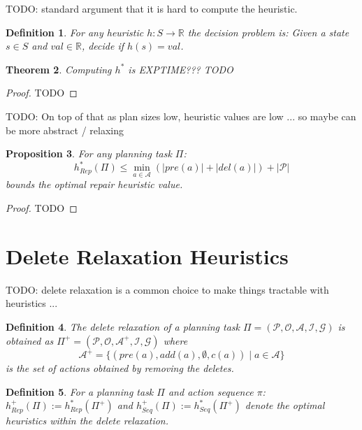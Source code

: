 \documentclass[twocolumn]{article}
\newcommand{\task}{\ensuremath{\Pi}\xspace}
\newcommand{\preds}{\ensuremath{\mathcal{P}}\xspace}
\newcommand{\acts}{\ensuremath{\mathcal{A}}\xspace}
\newcommand{\objects}{\ensuremath{\mathcal{O}}\xspace}
\newcommand{\init}{\ensuremath{\mathcal{I}}\xspace}
\newcommand{\goal}{\ensuremath{\mathcal{G}}\xspace}
\newcommand{\states}{\ensuremath{S}\xspace}
\newcommand{\someState}{\ensuremath{s}\xspace}
\newcommand{\prename}{\ensuremath{pre}\xspace}
\newcommand{\addname}{\ensuremath{add}\xspace}
\newcommand{\delname}{\ensuremath{del}\xspace}
\newcommand{\pre}[1]{\ensuremath{\prename(#1)}\xspace}
\newcommand{\add}[1]{\ensuremath{\addname(#1)}\xspace}
\newcommand{\del}[1]{\ensuremath{\delname(#1)}\xspace}
\newcommand{\arity}[1]{\ensuremath{|#1|}}
\newcommand{\cost}[1]{\ensuremath{c(#1)}\xspace}
\newcommand{\someAct}{\ensuremath{a}\xspace}
\newcommand{\someActSeq}{\ensuremath{\pi}\xspace}
\newcommand{\optimalHeuristic}{\ensuremath{h^{*}_{Rep}}\xspace}
\newcommand{\optimalHeuristicSeq}{\ensuremath{h^{*}_{Seq}}\xspace}
\newcommand{\optimalHeuristicRel}{\ensuremath{h^{+}_{Rep}}\xspace}
\newcommand{\optimalHeuristicSeqRel}{\ensuremath{h^{+}_{Seq}}\xspace}
\newcommand{\relaxedActs}{\ensuremath{\acts^{+}}\xspace}
\newcommand{\relaxedTask}{\ensuremath{\task^{+}}\xspace}
\newtheorem{theorem}{Theorem}
\newtheorem{proposition}[theorem]{Proposition}
\newtheorem{definition}[theorem]{Definition}
\begin{document}
	TODO: standard argument that it is hard to compute the heuristic.
	
	\begin{definition}
		For any heuristic $h: \states \rightarrow \mathbb{R}$ the decision problem is:
		Given a state $\someState \in \states$ and $\mathit{val} \in \mathbb{R}$, decide if $h(\someState) = \mathit{val}$.
	\end{definition}
	
	\begin{theorem}
		Computing $h^*$ is EXPTIME??? TODO
	\end{theorem}
	
	\begin{proof}
		TODO
	\end{proof}
	
	
	TODO:
	On top of that as plan sizes low, heuristic values are low ... so maybe can be more 
	abstract / relaxing
	
	\begin{proposition}
		For any planning task \task:
		$$\optimalHeuristic(\task) \leq \min_{\someAct \in \acts}(\arity{\pre{\someAct}} + \arity{\del{\someAct}}) + \arity{\preds}$$
		bounds the optimal repair heuristic value.
	\end{proposition}
	
	\begin{proof}
		TODO
	\end{proof}
	
	
	\section{Delete Relaxation Heuristics}
	
	TODO: delete relaxation is a common choice to make things tractable with heuristics ...
	
	\begin{definition}
		The delete relaxation of a planning task
		$\task = (\preds, \objects, \acts, \init, \goal)$
		is obtained as
		$\relaxedTask = (\preds, \objects, \relaxedActs, \init, \goal)$
		where 
		$$
		\relaxedActs = \{
		(\pre{\someAct}, \add{\someAct}, \emptyset, \cost{\someAct}) \mid \someAct \in \acts
		\}
		$$
		is the set of actions obtained by removing the deletes.
	\end{definition}
	
	\begin{definition}
		For a planning task \task and action sequence \someActSeq:
		$\optimalHeuristicRel(\task) := \optimalHeuristic(\relaxedTask)$
		and 
		$\optimalHeuristicSeqRel(\task) := \optimalHeuristicSeq(\relaxedTask)$
		denote the optimal heuristics within the delete relaxation.
	\end{definition}
	
\end{document}
